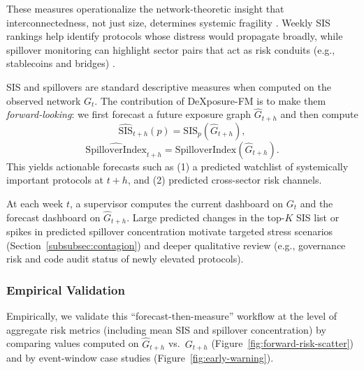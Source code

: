 These measures operationalize the network-theoretic insight that interconnectedness, not just size, determines systemic fragility \citep{Acemoglu2015SystemicRisk,GlassermanYoung2016Contagion}. Weekly SIS rankings help identify protocols whose distress would propagate broadly, while spillover monitoring can highlight sector pairs that act as risk conduits (e.g., stablecoins and bridges) \citep{KosseEtAl2023Stablecoin,ESRB2025,DieboldYilmaz2012}.

SIS and spillovers are standard {descriptive} measures when computed on the observed network $G_t$. The contribution of DeXposure-FM is to make them \emph{forward-looking}: we first forecast a future exposure graph $\hat{G}_{t+h}$ and then compute \[\widehat{\text{SIS}}_{t+h}(p)=\text{SIS}_p(\hat{G}_{t+h}),\] \[\widehat{\text{SpilloverIndex}}_{t+h}=\text{SpilloverIndex}(\hat{G}_{t+h}).\] 
This yields actionable forecasts such as (1) a predicted watchlist of systemically important protocols at $t+h$, and (2) predicted cross-sector risk channels. 

At each week $t$, a supervisor computes the current dashboard on $G_t$ and the forecast dashboard on $\hat{G}_{t+h}$. Large predicted changes in the top-$K$ SIS list or spikes in predicted spillover concentration motivate targeted stress scenarios (Section~\ref{subsubsec:contagion}) and deeper qualitative review (e.g., governance risk and code audit status of newly elevated protocols).
\subsubsection{Empirical Validation}

Empirically, we validate this ``forecast-then-measure'' workflow at the level of aggregate risk metrics (including mean SIS and spillover concentration) by comparing values computed on $\hat{G}_{t+h}$ vs.\ $G_{t+h}$ (Figure~\ref{fig:forward-risk-scatter}) and by event-window case studies (Figure~\ref{fig:early-warning}).


